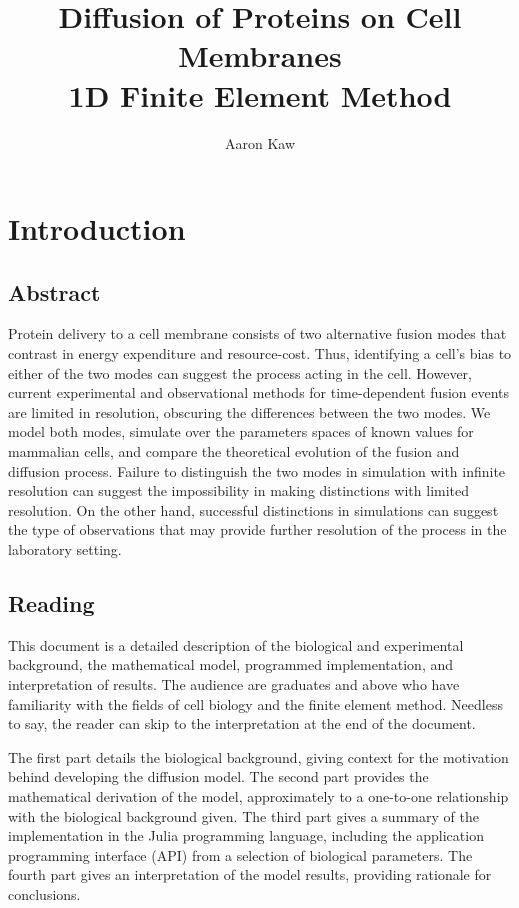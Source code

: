 \documentclass{report}
\title{Diffusion of Proteins on Cell Membranes \\ 1D Finite Element Method}
\author{Aaron Kaw}
\date{}
\begin{document}
\maketitle
\tableofcontents

\chapter{Introduction}
\section{Abstract}
Protein delivery to a cell membrane consists of two alternative fusion modes that contrast in energy expenditure and resource-cost. Thus, identifying a cell's bias to either of the two modes can suggest the process acting in the cell. However, current experimental and observational methods for time-dependent fusion events are limited in resolution, obscuring the differences between the two modes. We model both modes, simulate over the parameters spaces of known values for mammalian cells, and compare the theoretical evolution of the fusion and diffusion process. Failure to distinguish the two modes in simulation with infinite resolution can suggest the impossibility in making distinctions with limited resolution. On the other hand, successful distinctions in simulations can suggest the type of observations that may provide further resolution of the process in the laboratory setting.

\section{Reading}
This document is a detailed description of the biological and experimental background, the mathematical model, programmed implementation, and interpretation of results. The audience are graduates and above who have familiarity with the fields of cell biology and the finite element method. Needless to say, the reader can skip to the interpretation at the end of the document.

The first part details the biological background, giving context for the motivation behind developing the diffusion model.
The second part provides the mathematical derivation of the model, approximately to a one-to-one relationship with the biological background given.
The third part gives a summary of the implementation in the Julia programming language, including the application programming interface (API) from a selection of biological parameters.
The fourth part gives an interpretation of the model results, providing rationale for conclusions.
\end{document}
